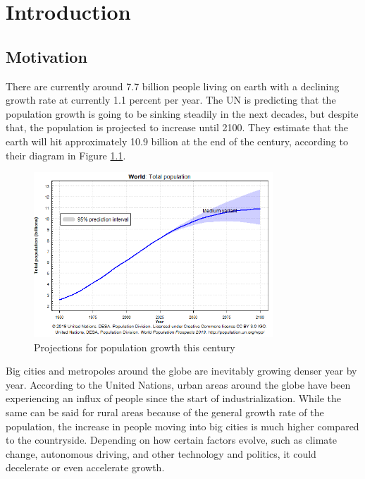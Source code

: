 
\chapter{Introduction}\label{chapter:introduction}
\section{Motivation}

There are currently around 7.7 billion people living on earth with a declining growth rate at currently 1.1 percent per year. The UN is predicting that the population growth is going to be sinking steadily in the next decades, but despite that, the population is projected to increase until 2100. They estimate that the earth will hit approximately 10.9 billion at the end of the century, according to their diagram in Figure \ref{fig:population}.

\begin{figure}[htpb]
  \centering
  \includegraphics[width=0.8\textwidth]{figures/population.png}
  \caption{Projections for population growth this century \cite{test}} 
  \label{fig:population}
\end{figure}


Big cities and metropoles around the globe are inevitably growing denser year by year. According to the United Nations, urban areas around the globe have been experiencing an influx of people since the start of industrialization. While the same can be said for rural areas because of the general growth rate of the population, the increase in people moving into big cities is much higher compared to the countryside.
Depending on how certain factors evolve, such as climate change, autonomous driving, and other technology and politics, it could decelerate or even accelerate growth.

